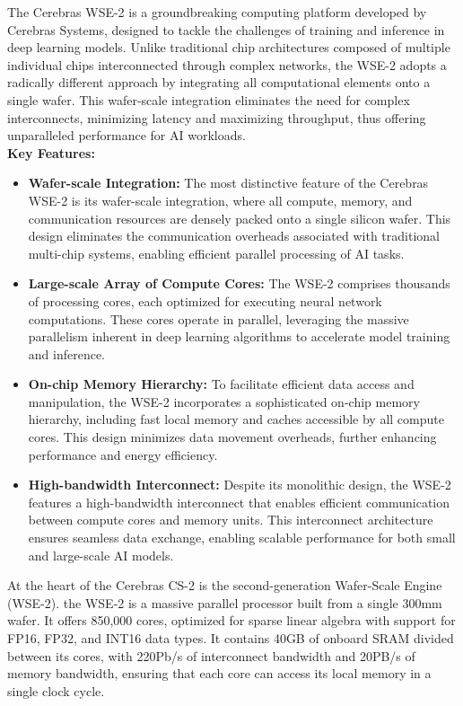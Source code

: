 The Cerebras WSE-2 is a groundbreaking computing platform developed by Cerebras Systems, designed to tackle the challenges of training and inference in deep learning models. Unlike traditional chip architectures composed of multiple individual chips interconnected through complex networks, the WSE-2 adopts a radically different approach by integrating all computational elements onto a single wafer. This wafer-scale integration eliminates the need for complex interconnects, minimizing latency and maximizing throughput, thus offering unparalleled performance for AI workloads.\\

\textbf{Key Features:}

\begin{itemize}
    \item \textbf{Wafer-scale Integration:} The most distinctive feature of the Cerebras WSE-2 is its wafer-scale integration, where all compute, memory, and communication resources are densely packed onto a single silicon wafer. This design eliminates the communication overheads associated with traditional multi-chip systems, enabling efficient parallel processing of AI tasks.
    \item \textbf{Large-scale Array of Compute Cores:} The WSE-2 comprises thousands of processing cores, each optimized for executing neural network computations. These cores operate in parallel, leveraging the massive parallelism inherent in deep learning algorithms to accelerate model training and inference.
    \item \textbf{On-chip Memory Hierarchy:} To facilitate efficient data access and manipulation, the WSE-2 incorporates a sophisticated on-chip memory hierarchy, including fast local memory and caches accessible by all compute cores. This design minimizes data movement overheads, further enhancing performance and energy efficiency.
    \item \textbf{High-bandwidth Interconnect:} Despite its monolithic design, the WSE-2 features a high-bandwidth interconnect that enables efficient communication between compute cores and memory units. This interconnect architecture ensures seamless data exchange, enabling scalable performance for both small and large-scale AI models.
\end{itemize}

At the heart of the Cerebras CS-2 is the second-generation Wafer-Scale Engine (WSE-2). the WSE-2 is a massive parallel processor built from a single 300mm wafer. It offers
850,000 cores, optimized for sparse linear algebra with support for FP16, FP32, and INT16 data
types. It contains 40GB of onboard SRAM divided between its cores, with 220Pb/s of interconnect
bandwidth and 20PB/s of memory bandwidth, ensuring that each core can access its local memory
in a single clock cycle.\\


